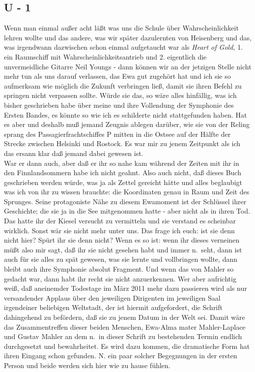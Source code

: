 \documentclass[
]{article}
\author{}
\date{\vspace{-2.5em}}
\begin{document}
\subsection{U - 1}\label{u---1}

Wenn man einmal außer acht läßt was uns die Schule über
Wahrscheinlichkeit lehren wollte und das andere, was wir später
dazulernten von Heisenberg und das, was irgendwann dazwischen schon
einmal aufgetaucht war als \emph{Heart of Gold,} 1. ein Raumschiff mit
Wahrscheinlichkeitsantrieb und 2. eigentlich die unvermeidliche Gitarre
Neil Youngs - dann können wir an der jetzigen Stelle nicht mehr tun als
uns darauf verlassen, das Ewa gut zugehört hat und ich sie so aufmerksam
wie möglich die Zukunft verbringen ließ, damit sie ihren Befehl zu
springen nicht verpassen sollte. Würde sie das, so wäre alles hinfällig,
was ich bisher geschrieben habe über meine und ihre Vollendung der
Symphonie des Ersten Bandes, es könnte so wie ich es schilderte nicht
stattgefunden haben. Hat es aber und deshalb muß jemand Zeugnis ablegen
darüber, wie sie von der Reling sprang des Passagierfrachtschiffes P
mitten in die Ostsee auf der Hälfte der Strecke zwischen Helsinki und
Rostock. Es war mir zu jenem Zeitpunkt als ich das ersann klar daß
jemand dabei gewesen ist.\\
War er dann auch, aber daß er ihr so nahe kam während der Zeiten mit ihr
in den Finnlandsommern habe ich nicht geahnt. Also auch nicht, daß
dieses Buch geschrieben werden würde, was ja als Zettel gereicht hätte
und alles beglaubigt was ich von ihr zu wissen brauchte: die Koordinaten
genau in Raum und Zeit des Sprunges. Seine protagoniste Nähe zu diesem
Ewamoment ist der Schlüssel ihrer Geschichte; die sie ja in die See
mitgenommen hatte - aber nicht als in ihren Tod. Das hatte ihr der
Kiesel versucht zu vermitteln und sie verstand es scheinbar wirklich.
Sonst wär sie nicht mehr unter uns. Das frage ich euch: ist sie denn
nicht hier? Spürt ihr sie denn nicht? Wenn es so ist: wenn ihr dieses
verneinen müßt also mir sagt, daß ihr sie nicht gesehen habt und immer
n.~seht, dann ist auch für sie alles zu spät gewesen, was sie lernte und
vollbringen wollte, dann bleibt auch ihre Symphonie absolut Fragment.
Und wenn das von Mahler so gedacht war, dann habt ihr recht sie nicht
anzuerkennen. Wer aber aufrichtig weiß, daß aneinemder Todestage im März
2011 mehr dazu passieren wird als nur versandender Applaus über den
jeweiligen Dirigenten im jeweiligen Saal irgendeiner beliebigen
Weltstadt, der ist hiermit aufgefordert, die Schrift dahingehend zu
befördern, daß sie zu jenem Datum in der Welt sei. Damit wäre das
Zusammentreffen dieser beiden Menschen, Ewa-Alma mater Mahler-Laplace
und Gustav Mahler an dem n.~in dieser Schrift zu bestehenden Termin
endlich durchgesetzt und bewahrheitet. Es wird dazu kommen, die
dramatische Form hat ihren Eingang schon gefunden. N. ein paar solcher
Begegnungen in der ersten Person und beide werden sich hier wie zu hause
fühlen.
\end{document}

